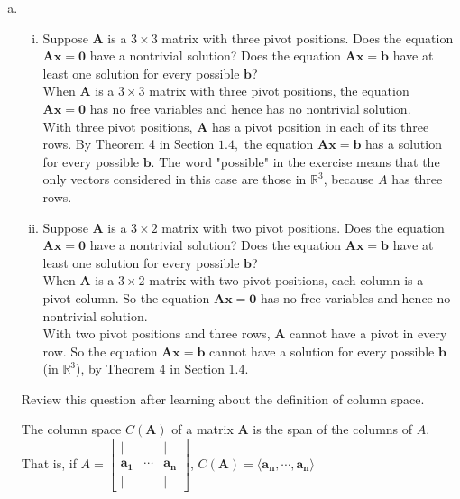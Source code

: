 \begin{enumerate}[(a)]
    \item 
    \begin{enumerate}[(i)]
        \item Suppose $\mathbf{A}$ is a $3 \times 3$ matrix with three pivot positions. Does the equation $\mathbf{A} \mathbf{x}=\mathbf{0}$ have a nontrivial solution? Does the equation $\mathbf{A} \mathbf{x}=\mathbf{b}$ have at least one solution for every possible $\mathbf{b}$?\\
        When $\mathbf{A}$ is a $3 \times 3$ matrix with three pivot positions, the equation $\mathbf{A} \mathbf{x}=\mathbf{0}$ has no free variables and hence has no nontrivial solution.\\
        With three pivot positions, $\mathbf{A}$ has a pivot position in each of its three rows. By Theorem 4 in Section $1.4,$ the equation $\mathbf{A} \mathbf{x}=\mathbf{b}$ has a solution for every possible $\mathbf{b}$. The word "possible" in the exercise means that the only vectors considered in this case are those in $\mathbb{R}^{3}$, because $A$ has three rows.
        \item Suppose $\mathbf{A}$ is a $3 \times 2$ matrix with two pivot positions. Does the equation $\mathbf{A} \mathbf{x}=\mathbf{0}$ have a nontrivial solution? Does the equation $\mathbf{A} \mathbf{x}=\mathbf{b}$ have at least one solution for every possible $\mathbf{b}$?\\
        When $\mathbf{A}$ is a $3 \times 2$ matrix with two pivot positions, each column is a pivot column. So the equation $\mathbf{A} \mathbf{x}=\mathbf{0}$ has no free variables and hence no nontrivial solution.\\
        With two pivot positions and three rows, $\mathbf{A}$ cannot have a pivot in every row. So the equation $\mathbf{A} \mathbf{x}=\mathbf{b}$ cannot have a solution for every possible $\mathbf{b}$ (in $\mathbb{R}^{3}$), by Theorem 4 in Section 1.4.
    \end{enumerate}
    \begin{remark}
    Review this question after learning about the definition of column space.
    \end{remark}
    \begin{definition}
    The column space $C(\mathbf{A})$ of a matrix $\mathbf{A}$ is the span of the columns of $A$. That is, if $A = \begin{bmatrix} \vert & & \vert \\ \mathbf{a_1} & \cdots & \mathbf{a_n} \\ \vert & & \vert\end{bmatrix}$, $C(\mathbf{A}) = \langle \mathbf{a_n}, \cdots, \mathbf{a_n}\rangle$

\end{definition}
\end{enumerate}
